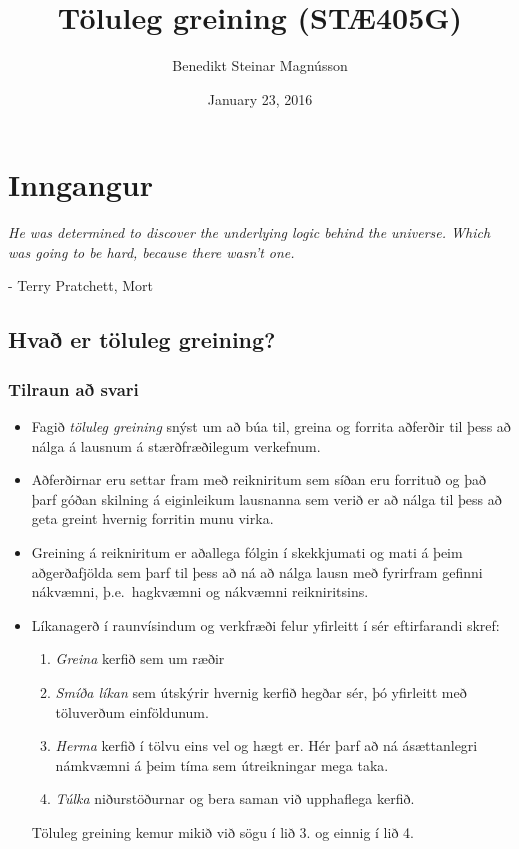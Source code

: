\documentclass[A4paper,10pt,icelandic]{sphinxmanual}
\title{Töluleg greining (STÆ405G)}
\date{January 23, 2016}
\author{Benedikt Steinar Magnússon}
\begin{document}
\maketitle
\tableofcontents
{}\label{index::doc}



\chapter{Inngangur}
\label{kafli01::doc}\label{kafli01:inngangur}
\emph{He was determined to discover the underlying logic behind the universe. Which was going to be hard, because there wasn't one.}

- Terry Pratchett, Mort


\section{Hvað er töluleg greining?}
\label{kafli01:hva-er-toluleg-greining}

\subsection{Tilraun að svari}
\label{kafli01:tilraun-a-svari}\begin{itemize}
\item {} 
Fagið \emph{töluleg greining} snýst um að búa til, greina og forrita
aðferðir til þess að nálga á lausnum á stærðfræðilegum verkefnum.

\item {} 
Aðferðirnar eru settar fram með reikniritum sem síðan eru forrituð og
það þarf góðan skilning á eiginleikum lausnanna sem verið er að nálga
til þess að geta greint hvernig forritin munu virka.

\item {} 
Greining á reikniritum er aðallega fólgin í skekkjumati og mati á
þeim aðgerðafjölda sem þarf til þess að ná að nálga lausn með
fyrirfram gefinni nákvæmni, þ.e. hagkvæmni og nákvæmni reikniritsins.

\item {} 
Líkanagerð í raunvísindum og verkfræði felur yfirleitt í sér eftirfarandi skref:
\begin{enumerate}
\item {} 
\emph{Greina} kerfið sem um ræðir

\item {} 
\emph{Smíða líkan} sem útskýrir hvernig kerfið hegðar sér, þó yfirleitt með töluverðum einföldunum.

\item {} 
\emph{Herma} kerfið í tölvu eins vel og hægt er. Hér þarf að ná ásættanlegri námkvæmni á þeim tíma sem útreikningar mega taka.

\item {} 
\emph{Túlka} niðurstöðurnar og bera saman við upphaflega kerfið.

\end{enumerate}

Töluleg greining kemur mikið við sögu í lið 3. og einnig í lið 4.

\end{itemize}
\end{document}

